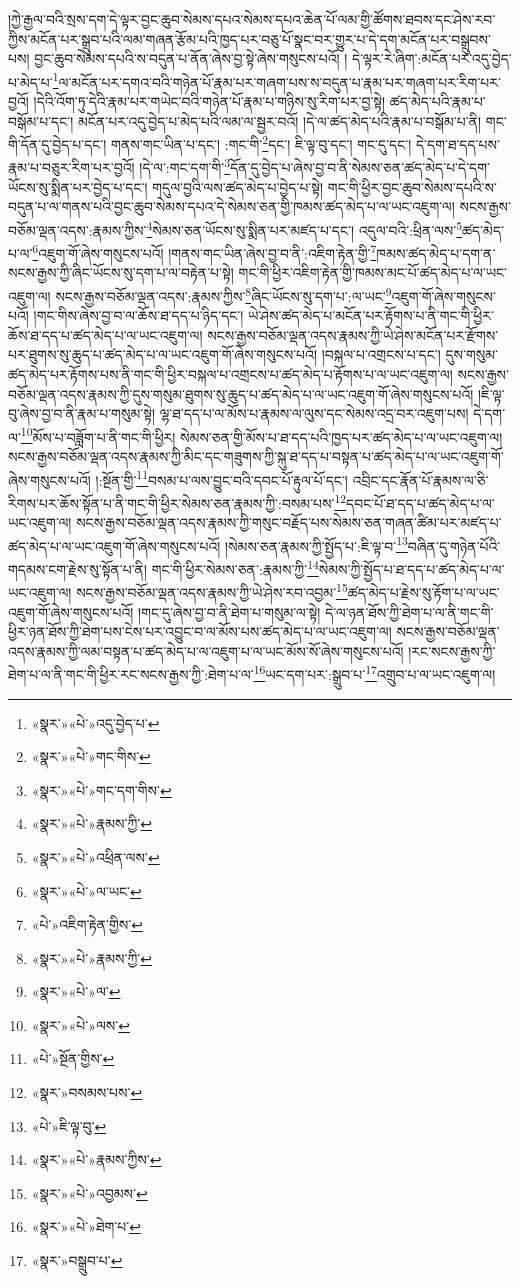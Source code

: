 །ཀྱེ་རྒྱལ་བའི་སྲས་དག་དེ་ལྟར་བྱང་ཆུབ་སེམས་དཔའ་སེམས་དཔའ་ཆེན་པོ་ལམ་གྱི་ཚོགས་ཐབས་དང་ཤེས་རབ་ཀྱིས་མངོན་པར་སྒྲུབ་པའི་ལམ་གཞན་རྩོམ་པའི་ཁྱད་པར་བཅུ་པོ་སྣང་བར་གྱུར་པ་དེ་དག་མངོན་པར་བསྒྲུབས་པས། བྱང་ཆུབ་སེམས་དཔའི་ས་བདུན་པ་ནོན་ཞེས་བྱ་སྟེ་ཞེས་གསུངས་པའོ། །
དེ་ལྟར་རེ་ཞིག་:མངོན་པར་འདུ་བྱེད་པ་མེད་པ་\footnote{«སྣར་»«པེ་»འདུ་བྱེད་པ་}ལ་མངོན་པར་དགའ་བའི་གཉེན་པོ་རྣམ་པར་གཞག་པས་ས་བདུན་པ་རྣམ་པར་གཞག་པར་རིག་པར་བྱའོ། །དེའི་འོག་ཏུ་དེའི་རྣམ་པར་གཡེང་བའི་གཉེན་པོ་རྣམ་པ་གཉིས་སུ་རིག་པར་བྱ་སྟེ། ཚད་མེད་པའི་རྣམ་པ་བསྒོམ་པ་དང་། མངོན་པར་འདུ་བྱེད་པ་མེད་པའི་ལམ་ལ་སྦྱར་བའོ། །དེ་ལ་ཚད་མེད་པའི་རྣམ་པ་བསྒོམ་པ་ནི། གང་གི་དོན་དུ་བྱེད་པ་དང་། གནས་གང་ཡིན་པ་དང་། :གང་གི་\footnote{«སྣར་»«པེ་»གང་གིས་}དང་། ཇི་ལྟ་བུ་དང་། གང་དུ་དང་། དེ་དག་ཐ་དད་པས་རྣམ་པ་བཅུར་རིག་པར་བྱའོ། །དེ་ལ་:གང་དག་གི་\footnote{«སྣར་»«པེ་»གང་དག་གིས་}དོན་དུ་བྱེད་པ་ཞེས་བྱ་བ་ནི་སེམས་ཅན་ཚད་མེད་པ་དེ་དག་ཡོངས་སུ་སྨིན་པར་བྱེད་པ་དང་། གདུལ་བྱའི་ལས་ཚད་མེད་པ་བྱེད་པ་སྟེ། གང་གི་ཕྱིར་བྱང་ཆུབ་སེམས་དཔའི་ས་བདུན་པ་ལ་གནས་པའི་བྱང་ཆུབ་སེམས་དཔའ་དེ་སེམས་ཅན་གྱི་ཁམས་ཚད་མེད་པ་ལ་ཡང་འཇུག་ལ། སངས་རྒྱས་བཅོམ་ལྡན་འདས་:རྣམས་ཀྱིས་\footnote{«སྣར་»«པེ་»རྣམས་ཀྱི་}སེམས་ཅན་ཡོངས་སུ་སྨིན་པར་མཛད་པ་དང་། འདུལ་བའི་:ཕྲིན་ལས་\footnote{«སྣར་»«པེ་»འཕྲིན་ལས་}ཚད་མེད་པ་ལ་\footnote{«སྣར་»«པེ་»ལ་ཡང་}འཇུག་གོ་ཞེས་གསུངས་པའོ། །གནས་གང་ཡིན་ཞེས་བྱ་བ་ནི་:འཇིག་རྟེན་གྱི་\footnote{«པེ་»འཇིག་རྟེན་གྱིས་}ཁམས་ཚད་མེད་པ་དག་ན་སངས་རྒྱས་ཀྱི་ཞིང་ཡོངས་སུ་དག་པ་ལ་བརྟེན་པ་སྟེ། གང་གི་ཕྱིར་འཇིག་རྟེན་གྱི་ཁམས་མང་པོ་ཚད་མེད་པ་ལ་ཡང་འཇུག་ལ། སངས་རྒྱས་བཅོམ་ལྡན་འདས་:རྣམས་ཀྱིས་\footnote{«སྣར་»«པེ་»རྣམས་ཀྱི་}ཞིང་ཡོངས་སུ་དག་པ་:ལ་ཡང་\footnote{«སྣར་»«པེ་»ལ་}འཇུག་གོ་ཞེས་གསུངས་པའོ། །གང་གིས་ཞེས་བྱ་བ་ལ་ཆོས་ཐ་དད་པ་ཉིད་དང་། ཡེ་ཤེས་ཚད་མེད་པ་མངོན་པར་རྟོགས་པ་ནི་གང་གི་ཕྱིར་ཆོས་ཐ་དད་པ་ཚད་མེད་པ་ལ་ཡང་འཇུག་ལ། སངས་རྒྱས་བཅོམ་ལྡན་འདས་རྣམས་ཀྱི་ཡེ་ཤེས་མངོན་པར་རྫོགས་པར་ཐུགས་སུ་ཆུད་པ་ཚད་མེད་པ་ལ་ཡང་འཇུག་གོ་ཞེས་གསུངས་པའོ། །བསྐལ་པ་འགྲངས་པ་དང་། དུས་གསུམ་ཚད་མེད་པར་རྟོགས་པས་ནི་གང་གི་ཕྱིར་བསྐལ་པ་འགྲངས་པ་ཚད་མེད་པ་རྟོགས་པ་ལ་ཡང་འཇུག་ལ། སངས་རྒྱས་བཅོམ་ལྡན་འདས་རྣམས་ཀྱི་དུས་གསུམ་ཐུགས་སུ་ཆུད་པ་ཚད་མེད་པ་ལ་ཡང་འཇུག་གོ་ཞེས་གསུངས་པའོ། །ཇི་ལྟ་བུ་ཞེས་བྱ་བ་ནི་རྣམ་པ་གསུམ་སྟེ། ལྷ་ཐ་དད་པ་ལ་མོས་པ་རྣམས་ལ་ལུས་དང་སེམས་འདྲ་བར་འཇུག་པས། དེ་དག་ལ་\footnote{«སྣར་»«པེ་»ལས་}མོས་པ་བཟློག་པ་ནི་གང་གི་ཕྱིར། སེམས་ཅན་གྱི་མོས་པ་ཐ་དད་པའི་ཁྱད་པར་ཚད་མེད་པ་ལ་ཡང་འཇུག་ལ། སངས་རྒྱས་བཅོམ་ལྡན་འདས་རྣམས་ཀྱི་མིང་དང་གཟུགས་ཀྱི་སྐུ་ཐ་དད་པ་བསྟན་པ་ཚད་མེད་པ་ལ་ཡང་འཇུག་གོ་ཞེས་གསུངས་པའོ། །:སྔོན་གྱི་\footnote{«པེ་»སྔོན་གྱིས་}བསམ་པ་ལས་བྱུང་བའི་དབང་པོ་རྟུལ་པོ་དང་། འབྲིང་དང་རྣོན་པོ་རྣམས་ལ་ཅི་རིགས་པར་ཆོས་སྟོན་པ་ནི་གང་གི་ཕྱིར་སེམས་ཅན་རྣམས་ཀྱི་:བསམ་པས་\footnote{«སྣར་»བསམས་པས་}དབང་པོ་ཐ་དད་པ་ཚད་མེད་པ་ལ་ཡང་འཇུག་ལ། སངས་རྒྱས་བཅོམ་ལྡན་འདས་རྣམས་ཀྱི་གསུང་བརྗོད་པས་སེམས་ཅན་གཞན་ཚིམ་པར་མཛད་པ་ཚད་མེད་པ་ལ་ཡང་འཇུག་གོ་ཞེས་གསུངས་པའོ། །སེམས་ཅན་རྣམས་ཀྱི་སྤྱོད་པ་:ཇི་ལྟ་བ་\footnote{«པེ་»ཇི་ལྟ་བུ་}བཞིན་དུ་གཉེན་པོའི་གདམས་ངག་རྗེས་སུ་སྟོན་པ་ནི། གང་གི་ཕྱིར་སེམས་ཅན་:རྣམས་ཀྱི་\footnote{«སྣར་»«པེ་»རྣམས་ཀྱིས་}སེམས་ཀྱི་སྤྱོད་པ་ཐ་དད་པ་ཚད་མེད་པ་ལ་ཡང་འཇུག་ལ། སངས་རྒྱས་བཅོམ་ལྡན་འདས་རྣམས་ཀྱི་ཡེ་ཤེས་རབ་འབྱམ་\footnote{«སྣར་»«པེ་»འབྱམས་}ཚད་མེད་པ་རྗེས་སུ་རྟོག་པ་ལ་ཡང་འཇུག་གོ་ཞེས་གསུངས་པའོ། །གང་དུ་ཞེས་བྱ་བ་ནི་ཐེག་པ་གསུམ་ལ་སྟེ། དེ་ལ་ཉན་ཐོས་ཀྱི་ཐེག་པ་ལ་ནི་གང་གི་ཕྱིར་ཉན་ཐོས་ཀྱི་ཐེག་པས་ངེས་པར་འབྱུང་བ་ལ་མོས་པས་ཚད་མེད་པ་ལ་ཡང་འཇུག་ལ། སངས་རྒྱས་བཅོམ་ལྡན་འདས་རྣམས་ཀྱི་ལམ་བསྟན་པ་ཚད་མེད་པ་ལ་འཇུག་པ་ལ་ཡང་མོས་སོ་ཞེས་གསུངས་པའོ། །རང་སངས་རྒྱས་ཀྱི་ཐེག་པ་ལ་ནི་གང་གི་ཕྱིར་རང་སངས་རྒྱས་ཀྱི་:ཐེག་པ་ལ་\footnote{«སྣར་»«པེ་»ཐེག་པ་}ཡང་དག་པར་:སྒྲུབ་པ་\footnote{«སྣར་»བསྒྲུབ་པ་}འགྲུབ་པ་ལ་ཡང་འཇུག་ལ། 
